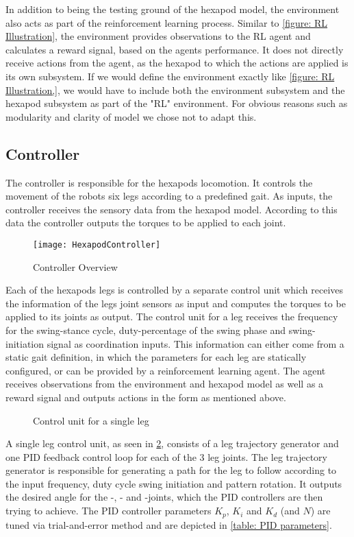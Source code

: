 In addition to being the testing ground of the hexapod model, the environment also acts as part of the reinforcement learning process.
Similar to \ref{figure: RL Illustration}, the environment provides observations to the RL agent and calculates a reward signal, based on the agents performance.
It does not directly receive actions from the agent, as the hexapod to which the actions are applied is its own subsystem.
If we would define the environment exactly like \ref{figure: RL Illustration,}, we would have to include both the environment subsystem and the hexapod subsystem as part of the "RL" environment.
For obvious reasons such as modularity and clarity of model we chose not to adapt this.

\subsection{Controller}
The controller is responsible for the hexapods locomotion.
It controls the movement of the robots six legs according to a predefined gait.
As inputs, the controller receives the sensory data from the hexapod model.
According to this data the controller outputs the torques to be applied to each joint.

\begin{figure}
	\centerline{\texttt{[image: HexapodController]}}
	\caption{Controller Overview}
	\label{figure: Controller Overview}
\end{figure}
Each of the hexapods legs is controlled by a separate control unit which receives the information of the legs joint sensors as input and computes the torques to be applied to its joints as output.
The control unit for a leg receives the frequency for the swing-stance cycle, duty-percentage of the swing phase and swing-initiation signal as coordination inputs.
This information can either come from a static gait definition, in which the parameters for each leg are statically configured, or can be provided by a reinforcement learning agent.
The agent receives observations from the environment and hexapod model as well as a reward signal and outputs actions in the form as mentioned above.

\begin{figure}
	\centerline{}
	\caption{Control unit for a single leg}
	\label{figure: Leg control unit}
\end{figure}

A single leg control unit, as seen in \ref{figure: Leg control unit}, consists of a leg trajectory generator and one PID feedback control loop for each of the 3 leg joints.
The leg trajectory generator is responsible for generating a path for the leg to follow according to the input frequency, duty cycle swing initiation and pattern rotation.
It outputs the desired angle for the \textalpha-, \textbeta- and \textgamma-joints, which the PID controllers are then trying to achieve.
The PID controller parameters $K_p$, $K_i$ and $K_d$ (and $N$) are tuned via trial-and-error method and are depicted in \ref{table: PID parameters}.

